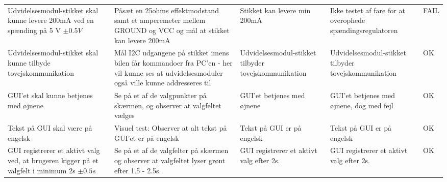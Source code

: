 \begin{tabu}{ X[l,1] X[l,1] X[l,1] X[l,1] X[l,0.9]}
\hline
Udvidelsesmodul-stikket skal kunne levere 200mA ved en spænding på 5 V $\pm 0.5 V$  & Påsæt en 25ohms effektmodstand samt et amperemeter mellem GROUND og VCC og mål at stikket kan levere 200mA & Stikket kan levere min 200mA & Ikke testet af fare for at overophede spændingsregulatoren & FAIL \\
\hdashline
Udvidelsesmodul-stikket skal kunne tilbyde tovejskommunikation & Mål I2C udgangene på stikket imens bilen får kommandoer fra PC'en - her vil kunne ses at udvidelsesmoduler også ville kunne addresseres til & Udvidelsesmodul-stikket tilbyder tovejskommunikation & Udvidelsesmodul-stikket tilbyder tovejskommunikation & OK \\
\hdashline
GUI'et skal kunne betjenes med øjnene & Se på et af de valgpunkter på skærmen, og observer at valgfeltet vælges & GUI'et betjenes med øjnene & GUI'et betjenes med øjnene, dog med fejl & OK \\
\hdashline
Tekst på GUI skal være på engelsk & Visuel test: Observer at alt tekst på GUI'et er på engelsk & Tekst på GUI er på engelsk & Tekst på GUI er på engelsk & OK \\
\hdashline
GUI registrerer et aktivt valg ved, at brugeren kigger på et valgfelt i minimum 2s $\pm 0.5s$ & Se på et af de valgfelter på skærmen og observer at valgfeltet lyser grønt efter 1.5 - 2.5s. & GUI registrerer et aktivt valg efter 2s. & GUI registrerer et aktivt valg efter 2s. & OK \\
\hline
\end{tabu}
%